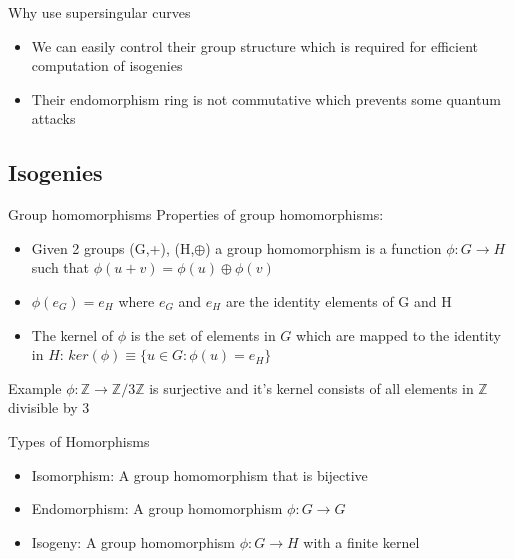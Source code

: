 \documentclass[handout]{beamer}
\begin{document}
\begin{frame}{Why use supersingular curves}
\begin{itemize}[\textbullet]
	\item We can easily control their group structure which is required for efficient computation of isogenies
	\item Their endomorphism ring is not commutative which  prevents some quantum attacks
\end{itemize}
\end{frame}




\subsection{Isogenies}
\begin{frame}{Group homomorphisms}
Properties of group homomorphisms:
\begin{itemize}[\textbullet]
	\item Given 2 groups (G,+), (H,$\oplus$) a group homomorphism is a function $\phi: G \to H$ such that $\phi(u + v) = \phi(u) \oplus \phi(v)$ \pause
	\item $\phi(e_G) = e_H$ where $e_G$ and $e_H$ are the identity elements of G and H\pause
	\item The kernel of $\phi$ is the set of elements in $G$ which are mapped to the identity in $H$:
	$ker(\phi) \equiv \{u\in G:\phi(u)=e_H\}$
\end{itemize}
	 
	
	\begin{block}{Example}
		$\phi: \mathbb{Z}\to\mathbb{Z}/3\mathbb{Z}$ is surjective and it's kernel consists of all elements in $\mathbb{Z}$ divisible by 3
		
		
	\end{block}
\end{frame}
\begin{frame}{Types of Homorphisms}
	\begin{itemize}[\textbullet]
		\item Isomorphism: A group homomorphism that is bijective \pause
		\item Endomorphism: A group homomorphism $\phi: G \to G$\pause
		\item Isogeny: A group homomorphism $\phi : G \to H$ with a finite kernel
	\end{itemize}

\end{frame}
\end{document}
